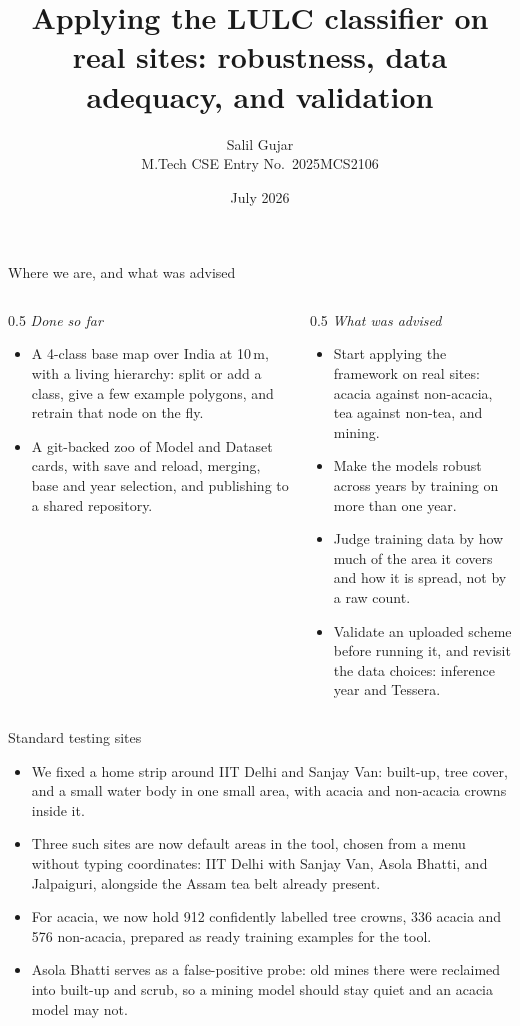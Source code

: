 \documentclass[aspectratio=169]{beamer}
\title[Applying and hardening the LULC classifier]{Applying the LULC classifier on real sites: robustness, data adequacy, and validation}
\author[Salil Gujar]{Salil Gujar \\ \footnotesize M.Tech CSE \quad Entry No.\ 2025MCS2106}
\date{July 2026}
\begin{document}
\frame{\titlepage}

\begin{frame}{Where we are, and what was advised}
\begin{columns}[T]
\begin{column}{0.5\textwidth}
\emph{Done so far}
\begin{itemize}\small
  \item A 4-class base map over India at 10\,m, with a living hierarchy: split or add a class,
  give a few example polygons, and retrain that node on the fly.
  \item A git-backed zoo of Model and Dataset cards, with save and reload, merging, base and
  year selection, and publishing to a shared repository.
\end{itemize}
\end{column}
\begin{column}{0.5\textwidth}
\emph{What was advised}
\begin{itemize}\small
  \item Start applying the framework on real sites: acacia against non-acacia, tea against
  non-tea, and mining.
  \item Make the models robust across years by training on more than one year.
  \item Judge training data by how much of the area it covers and how it is spread, not by a
  raw count.
  \item Validate an uploaded scheme before running it, and revisit the data choices: inference
  year and Tessera.
\end{itemize}
\end{column}
\end{columns}
\end{frame}

\begin{frame}{Standard testing sites}
\begin{itemize}
  \item We fixed a home strip around IIT Delhi and Sanjay Van: built-up, tree cover, and a small
  water body in one small area, with acacia and non-acacia crowns inside it.
  \item Three such sites are now default areas in the tool, chosen from a menu without typing
  coordinates: IIT Delhi with Sanjay Van, Asola Bhatti, and Jalpaiguri, alongside the Assam tea
  belt already present.
  \item For acacia, we now hold 912 confidently labelled tree crowns, 336 acacia and 576
  non-acacia, prepared as ready training examples for the tool.
  \item Asola Bhatti serves as a false-positive probe: old mines there were reclaimed into
  built-up and scrub, so a mining model should stay quiet and an acacia model may not.
\end{itemize}
\end{frame}
\end{document}
